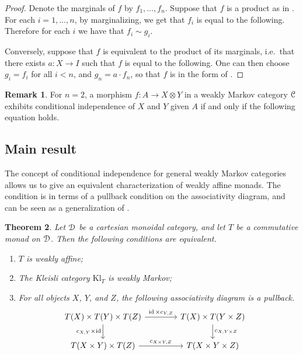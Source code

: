 \documentclass[a4paper,UKenglish,numberwithinsect,cleveref, autoref, thm-restate]{lipics-v2021}
\theoremstyle{plain} %
\newtheorem{mytheorem}{Theorem}[section]
\theoremstyle{definition} %
\newtheorem{myremark}[mytheorem]{Remark}
\begin{document}
\begin{proof}
 Denote the marginals of $f$ by $f_1,\dots,f_n$.
 Suppose that $f$ is a product as in . For each $i=1,\dots,n$, by marginalizing, we get that $f_i$ is equal to the following.
 Therefore for each $i$ we have that $f_i\sim g_i$. 
 
 Conversely, suppose that $f$ is equivalent to the product of its marginals, i.e.~that there exists $a:X\to I$ such that $f$ is equal to the following.
 One can then choose $g_i=f_i$ for all $i<n$, and $g_n = a\cdot f_n$, so that $f$ is in the form of .
\end{proof} 
 
\begin{myremark}
 For $n=2$, a morphism $f:A\to X\otimes Y$ in a weakly Markov category $\mathcal{C}$ exhibits conditional independence of $X$ and $Y$ given $A$ 
 if and only if the following equation holds.
\end{myremark}


\subsection{Main result}

The concept of conditional independence for general weakly Markov categories allows us to give an equivalent characterization of weakly affine monads.
The condition is in terms of a pullback condition on the associativity diagram, and can be seen as a generalization of .

\begin{mytheorem}\label{mainthm}
 Let $\mathcal{D}$ be a cartesian monoidal category, and let $T$ be a commutative monad on $\mathcal{D}$.
 Then the following conditions are equivalent.
 \begin{enumerate}
  \item\label{condgroup} $T$ is weakly affine;
  \item\label{condwm} The Kleisli category $\mathrm{Kl}_T$ is weakly Markov;
  \item\label{condpullback} For all objects $X$, $Y$, and $Z$, the following associativity diagram is a pullback.
	\begin{equation}
		\label{assoc_pullback}
		\hspace{-9pt}	%
		\begin{tikzcd}[column sep=3.3pc]
			T(X) \times T(Y) \times T(Z) \ar{r}{\id \times c_{Y,Z}} \ar[swap]{d}{c_{X,Y} \times \id}	& T(X) \times T(Y \times Z) \ar{d}{c_{X,Y \times Z}}	\\
			T(X \times Y) \times T(Z) \ar{r}{c_{X\times Y,Z}}						& T(X \times Y \times Z)
		\end{tikzcd}
	\end{equation}
 \end{enumerate}
\end{mytheorem}
\end{document}

